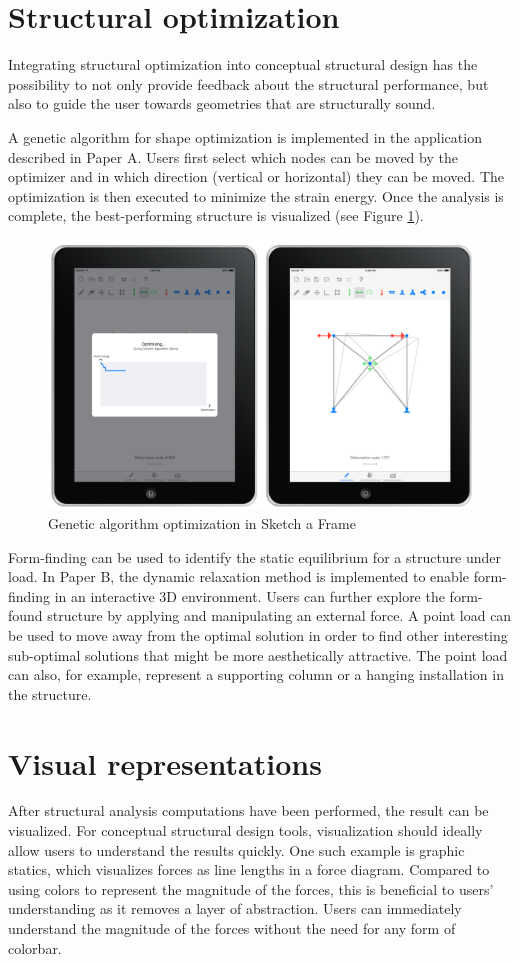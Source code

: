 \section{Structural optimization}
Integrating structural optimization into conceptual structural design has the possibility to not only provide feedback about the structural performance, but also to guide the user towards geometries that are structurally sound. 

A genetic algorithm for shape optimization is implemented in the application described in Paper A. Users first select which nodes can be moved by the optimizer and in which direction (vertical or horizontal) they can be moved. The optimization is then executed to minimize the strain energy. Once the analysis is complete, the best-performing structure is visualized (see Figure \ref{fig:ipad-ga}). 

\begin{figure}
  \includegraphics[width=330pt]{graphics/ipad-ga.png}
  \caption{Genetic algorithm optimization in Sketch a Frame}
  \label{fig:ipad-ga}
\end{figure}

Form-finding can be used to identify the static equilibrium for a structure under load. In Paper B, the dynamic relaxation method is implemented to enable form-finding in an interactive 3D environment. Users can further explore the form-found structure by applying and manipulating an external force. A point load can be used to move away from the optimal solution in order to find other interesting sub-optimal solutions that might be more aesthetically attractive. The point load can also, for example, represent a supporting column or a hanging installation in the structure.


\section{Visual representations}
After structural analysis computations have been performed, the result can be visualized. For conceptual structural design tools, visualization should ideally allow users to understand the results quickly. One such example is graphic statics, which visualizes forces as line lengths in a force diagram. Compared to using colors to represent the magnitude of the forces, this is beneficial to users’ understanding as it removes a layer of abstraction. Users can immediately understand the magnitude of the forces without the need for any form of colorbar.

